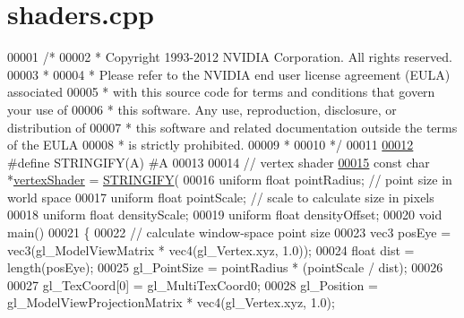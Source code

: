 \hypertarget{shaders_8cpp_source}{\section{shaders.\-cpp}
}

\begin{DoxyCode}
00001 \textcolor{comment}{/*}
00002 \textcolor{comment}{ * Copyright 1993-2012 NVIDIA Corporation.  All rights reserved.}
00003 \textcolor{comment}{ *}
00004 \textcolor{comment}{ * Please refer to the NVIDIA end user license agreement (EULA) associated}
00005 \textcolor{comment}{ * with this source code for terms and conditions that govern your use of}
00006 \textcolor{comment}{ * this software. Any use, reproduction, disclosure, or distribution of}
00007 \textcolor{comment}{ * this software and related documentation outside the terms of the EULA}
00008 \textcolor{comment}{ * is strictly prohibited.}
00009 \textcolor{comment}{ *}
00010 \textcolor{comment}{ */}
00011 
\hypertarget{shaders_8cpp_source_l00012}{}\hyperlink{shaders_8cpp_ab06e1eb2e9bf38e0d452b1f796aed208}{00012} \textcolor{preprocessor}{#}\textcolor{preprocessor}{define} \textcolor{preprocessor}{STRINGIFY}\textcolor{preprocessor}{(}\textcolor{preprocessor}{A}\textcolor{preprocessor}{)} \textcolor{preprocessor}{#}\textcolor{preprocessor}{A}
00013 
00014 \textcolor{comment}{// vertex shader}
\hypertarget{shaders_8cpp_source_l00015}{}\hyperlink{shaders_8cpp_aea8e0959f6b7eabf6156f801e179da60}{00015} \textcolor{keyword}{const} \textcolor{keywordtype}{char} *\hyperlink{shaders_8cpp_aea8e0959f6b7eabf6156f801e179da60}{vertexShader} = \hyperlink{shaders_8cpp_ab06e1eb2e9bf38e0d452b1f796aed208}{STRINGIFY}(
00016                                uniform \textcolor{keywordtype}{float} pointRadius;  \textcolor{comment}{// point size in world space}
00017                                uniform \textcolor{keywordtype}{float} pointScale;   \textcolor{comment}{// scale to calculate size in pixels}
00018                                uniform \textcolor{keywordtype}{float} densityScale;
00019                                uniform \textcolor{keywordtype}{float} densityOffset;
00020                                \textcolor{keywordtype}{void} main()
00021 \{
00022     \textcolor{comment}{// calculate window-space point size}
00023     vec3 posEye = vec3(gl\_ModelViewMatrix * vec4(gl\_Vertex.xyz, 1.0));
00024     \textcolor{keywordtype}{float} dist = length(posEye);
00025     gl\_PointSize = pointRadius * (pointScale / dist);
00026 
00027     gl\_TexCoord[0] = gl\_MultiTexCoord0;
00028     gl\_Position = gl\_ModelViewProjectionMatrix * vec4(gl\_Vertex.xyz, 1.0);

\end{DoxyCode}
